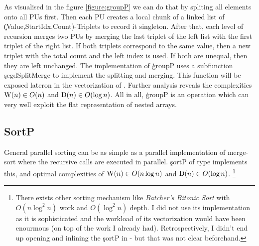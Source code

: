     As visualised in the figure \ref{figure:groupP}
    we can do that by spliting all elements onto all PUs first.
    Then each PU creates a local chunk of a linked list of
    \c{(Value,StartIdx,Count)}-Triplets to record it singleton.
    After that, each level of recursion merges two PUs by
    merging the last triplet of the left list with the first triplet
    of the right list. If both triplets correspond to the same value,
    then a new triplet with the total count and the left index is used.
    If both are unequal, then they are left unchanged. The implementation
    of \c{groupP} uses a subfunction \c{segdSplitMerge} to implement the
    splitting and merging. This function will be exposed lateron in
    the vectorization of \ndpn.
    Further analysis reveals the complexities $\textrm{W}(n) \in O(n)$ and $\textrm{D}(n) \in O(\log n)$.
    All in all, \c{groupP} is an operation which can very well exploit the flat representation of nested arrays.
    
  \subsection{SortP}
    General parallel sorting can be as simple as a parallel
    implementation of merge-sort where the recursive calls are executed
    in parallel. \c{sortP} of type \type{[:a:] -> [:a:]} implements this,
    and optimal complexities of $\textrm{W}(n) \in O(n \log n)$
    and $\textrm{D}(n) \in O(\log n)$.
    \footnote{There exists other sorting mechanism
    like \emph{Batcher's Bitonic Sort} with $O(n \log^2 n)$ work and $O(\log^2 n)$
    depth. I did not use its implementation as it is sophisticated and
    the workload of its vectorization would have been enourmous (on top of the work I already had).
    Retrospectively, I didn't end up opening and inlining the \c{sortP} in \ndpn - but that
    was not clear beforehand.
    }

